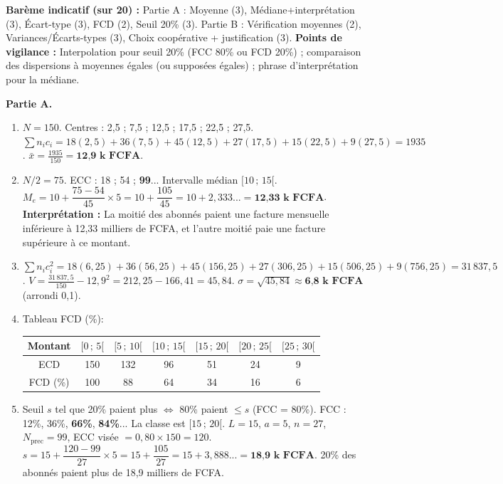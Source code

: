 \documentclass[11pt]{article}
\begin{document}
\begin{corrige}
\textbf{Barème indicatif (sur 20) :} Partie A : Moyenne (3), Médiane+interprétation (3), Écart-type (3), FCD (2), Seuil 20\% (3). Partie B : Vérification moyennes (2), Variances/Écarts-types (3), Choix coopérative + justification (3).
\textbf{Points de vigilance :} Interpolation pour seuil 20\% (FCC 80\% ou FCD 20\%) ; comparaison des dispersions à moyennes égales (ou supposées égales) ; phrase d'interprétation pour la médiane.

\textbf{Partie A.}
\begin{enumerate}
\item $N=150$. Centres : 2,5 ; 7,5 ; 12,5 ; 17,5 ; 22,5 ; 27,5.
$\sum n_i c_i = 18(2,5)+36(7,5)+45(12,5)+27(17,5)+15(22,5)+9(27,5) = 1935$.
$\bar{x} = \frac{1935}{150} = \textbf{12,9 k FCFA}$.
\item $N/2 = 75$. ECC : 18 ; 54 ; \textbf{99}... Intervalle médian $[10\,;\,15[$.
$M_e = 10 + \dfrac{75-54}{45}\times 5 = 10 + \dfrac{105}{45} = 10 + 2,333... = \textbf{12,33 k FCFA}$.
\textbf{Interprétation :} La moitié des abonnés paient une facture mensuelle inférieure à 12,33 milliers de FCFA, et l'autre moitié paie une facture supérieure à ce montant.
\item $\sum n_i c_i^2 = 18(6,25)+36(56,25)+45(156,25)+27(306,25)+15(506,25)+9(756,25) = 31\,837,5$.
$V = \frac{31\,837,5}{150} - 12,9^2 = 212,25 - 166,41 = 45,84$.
$\sigma = \sqrt{45,84} \approx \textbf{6,8 k FCFA}$ (arrondi 0,1).
\item Tableau FCD (\%):
\begin{center}
\begin{tabular}{|c|cccccc|}\hline
Montant & $[0\,;\,5[$ & $[5\,;\,10[$ & $[10\,;\,15[$ & $[15\,;\,20[$ & $[20\,;\,25[$ & $[25\,;\,30[$ \\ \hline
ECD & 150 & 132 & 96 & 51 & 24 & 9 \\
FCD (\%) & 100 & 88 & 64 & 34 & 16 & 6 \\ \hline
\end{tabular}
\end{center}
\item Seuil $s$ tel que 20\% paient plus $\Leftrightarrow$ 80\% paient $\le s$ (FCC = 80\%).
FCC : 12\%, 36\%, \textbf{66\%}, \textbf{84\%}... La classe est $[15\,;\,20[$.
$L=15$, $a=5$, $n=27$, $N_{\text{prec}}=99$, ECC visée $= 0,80\times150 = 120$.
$s = 15 + \dfrac{120-99}{27}\times 5 = 15 + \dfrac{105}{27} = 15 + 3,888... = \textbf{18,9 k FCFA}$.
20\% des abonnés paient plus de 18,9 milliers de FCFA.
\end{enumerate}


\end{corrige}
\end{document}
